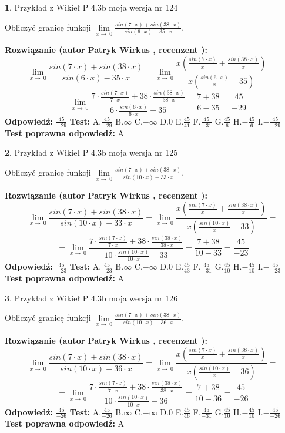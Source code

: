 \documentclass[12pt, a4paper]{article}
\theoremstyle{definition} %
\newtheorem{zad}{}
\newcommand{\zadStart}[1]{\begin{zad}#1\newline}
\newcommand{\zadStop}{\end{zad}}
\newcommand{\rozwStart}[2]{\noindent \textbf{Rozwiązanie (autor #1 , recenzent #2): }\newline}
\newcommand{\rozwStop}{\newline}
\newcommand{\odpStart}{\noindent \textbf{Odpowiedź:}\newline}
\newcommand{\odpStop}{\newline}
\newcommand{\testStart}{\noindent \textbf{Test:}\newline}
\newcommand{\testStop}{\newline}
\newcommand{\kluczStart}{\noindent \textbf{Test poprawna odpowiedź:}\newline}
\newcommand{\kluczStop}{\newline}
\begin{document}
\zadStart{Przykład z Wikieł P 4.3b moja wersja nr 124}


Obliczyć granicę funkcji $\lim\limits_{x\to\ 0}\frac{sin(7 \cdot x)+sin(38 \cdot x)}{sin(6 \cdot x)-35 \cdot x}$.
\zadStop
\rozwStart{Patryk Wirkus}{}
$$\lim\limits_{x\to\ 0}\frac{sin(7 \cdot x)+sin(38 \cdot x)}{sin(6 \cdot x)-35 \cdot x}=\lim\limits_{x\to\ 0}\frac{x(\frac{sin(7 \cdot x)}{x}+\frac{sin(38 \cdot x)}{x})}{x(\frac{sin(6 \cdot x)}{x}-35)}=$$
$$=\lim\limits_{x\to\ 0}\frac{7 \cdot \frac{sin(7 \cdot x)}{7 \cdot x}+38 \cdot \frac{sin(38 \cdot x)}{38 \cdot x}}{6 \cdot \frac{sin(6 \cdot x)}{6 \cdot x}-35}=\frac{7+38}{6-35} = \frac{45}{-29}$$
\rozwStop
\odpStart
$\frac{45}{-29}$
\odpStop
\testStart
A.$\frac{45}{-29}$
B.$\infty$
C.$-\infty$
D.$0$
E.$\frac{45}{41}$
F.$\frac{45}{-31}$
G.$\frac{45}{6}$
H.$-\frac{45}{6}$
I.$-\frac{45}{-29}$
\testStop
\kluczStart
A
\kluczStop



\zadStart{Przykład z Wikieł P 4.3b moja wersja nr 125}


Obliczyć granicę funkcji $\lim\limits_{x\to\ 0}\frac{sin(7 \cdot x)+sin(38 \cdot x)}{sin(10 \cdot x)-33 \cdot x}$.
\zadStop
\rozwStart{Patryk Wirkus}{}
$$\lim\limits_{x\to\ 0}\frac{sin(7 \cdot x)+sin(38 \cdot x)}{sin(10 \cdot x)-33 \cdot x}=\lim\limits_{x\to\ 0}\frac{x(\frac{sin(7 \cdot x)}{x}+\frac{sin(38 \cdot x)}{x})}{x(\frac{sin(10 \cdot x)}{x}-33)}=$$
$$=\lim\limits_{x\to\ 0}\frac{7 \cdot \frac{sin(7 \cdot x)}{7 \cdot x}+38 \cdot \frac{sin(38 \cdot x)}{38 \cdot x}}{10 \cdot \frac{sin(10 \cdot x)}{10 \cdot x}-33}=\frac{7+38}{10-33} = \frac{45}{-23}$$
\rozwStop
\odpStart
$\frac{45}{-23}$
\odpStop
\testStart
A.$\frac{45}{-23}$
B.$\infty$
C.$-\infty$
D.$0$
E.$\frac{45}{43}$
F.$\frac{45}{-31}$
G.$\frac{45}{10}$
H.$-\frac{45}{10}$
I.$-\frac{45}{-23}$
\testStop
\kluczStart
A
\kluczStop



\zadStart{Przykład z Wikieł P 4.3b moja wersja nr 126}


Obliczyć granicę funkcji $\lim\limits_{x\to\ 0}\frac{sin(7 \cdot x)+sin(38 \cdot x)}{sin(10 \cdot x)-36 \cdot x}$.
\zadStop
\rozwStart{Patryk Wirkus}{}
$$\lim\limits_{x\to\ 0}\frac{sin(7 \cdot x)+sin(38 \cdot x)}{sin(10 \cdot x)-36 \cdot x}=\lim\limits_{x\to\ 0}\frac{x(\frac{sin(7 \cdot x)}{x}+\frac{sin(38 \cdot x)}{x})}{x(\frac{sin(10 \cdot x)}{x}-36)}=$$
$$=\lim\limits_{x\to\ 0}\frac{7 \cdot \frac{sin(7 \cdot x)}{7 \cdot x}+38 \cdot \frac{sin(38 \cdot x)}{38 \cdot x}}{10 \cdot \frac{sin(10 \cdot x)}{10 \cdot x}-36}=\frac{7+38}{10-36} = \frac{45}{-26}$$
\rozwStop
\odpStart
$\frac{45}{-26}$
\odpStop
\testStart
A.$\frac{45}{-26}$
B.$\infty$
C.$-\infty$
D.$0$
E.$\frac{45}{46}$
F.$\frac{45}{-31}$
G.$\frac{45}{10}$
H.$-\frac{45}{10}$
I.$-\frac{45}{-26}$
\testStop
\kluczStart
A
\kluczStop
\end{document}
